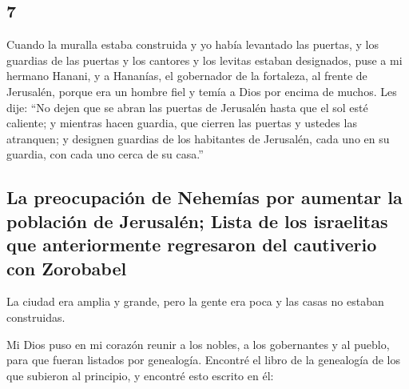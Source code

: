 \begin{paracol}{2}
\hypertarget{section-12}{%
\section{7}\label{section-12}}

 Cuando la muralla estaba construida y yo había levantado
las puertas, y los guardias de las puertas y los cantores y los levitas
estaban designados,  puse a mi hermano Hanani, y a
Hananías, el gobernador de la fortaleza, al frente de Jerusalén, porque
era un hombre fiel y temía a Dios por encima de muchos. 
Les dije: ``No dejen que se abran las puertas de Jerusalén hasta que el
sol esté caliente; y mientras hacen guardia, que cierren las puertas y
ustedes las atranquen; y designen guardias de los habitantes de
Jerusalén, cada uno en su guardia, con cada uno cerca de su casa.''

\hypertarget{la-preocupaciuxf3n-de-nehemuxedas-por-aumentar-la-poblaciuxf3n-de-jerusaluxe9n-lista-de-los-israelitas-que-anteriormente-regresaron-del-cautiverio-con-zorobabel}{%
\subsection{La preocupación de Nehemías por aumentar la población de
Jerusalén; Lista de los israelitas que anteriormente regresaron del
cautiverio con
Zorobabel}\label{la-preocupaciuxf3n-de-nehemuxedas-por-aumentar-la-poblaciuxf3n-de-jerusaluxe9n-lista-de-los-israelitas-que-anteriormente-regresaron-del-cautiverio-con-zorobabel}}

 La ciudad era amplia y grande, pero la gente era poca y
las casas no estaban construidas.

 Mi Dios puso en mi corazón reunir a los nobles, a los
gobernantes y al pueblo, para que fueran listados por genealogía.
Encontré el libro de la genealogía de los que subieron al principio, y
encontré esto escrito en él:


\end{paracol}
